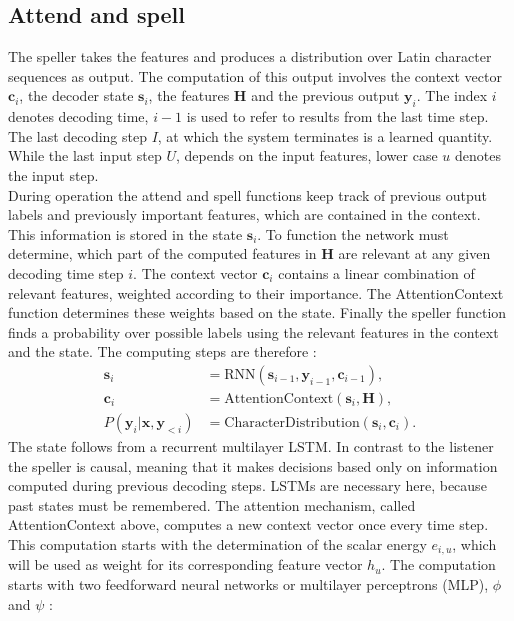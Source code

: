 \subsection{Attend and spell}
\label{subsec:AttendAndSpell}
The speller takes the features and produces a distribution over Latin character sequences as output. The computation of this output involves the context vector $\mathbf{c}_i$, the decoder state $\mathbf{s}_i$, the features $\mathbf{H}$ and the previous output $\mathbf{y}_i$. The index $i$ denotes decoding time, $i-1$ is used to refer to results from the last time step. The last decoding step $I$, at which the system terminates is a learned quantity. While the last input step $U$, depends on the input features, lower case $u$ denotes the input step.\\
During operation the attend and spell functions keep track of previous output labels and previously important features, which are contained in the context. This information is stored in the state $\mathbf{s}_i$. To function the network must determine, which part of the computed features in $\mathbf{H}$ are relevant at any given decoding time step $i$. The context vector $\mathbf{c}_i$ contains a linear combination of relevant features, weighted according to their importance. The AttentionContext function determines these weights based on the state. Finally the speller function finds a probability over possible labels using the relevant features in the context and the state. The computing steps are therefore \cite[page 4]{Chan2015}:
\begin{align}
 \mathbf{s}_i &= \text{RNN}(\mathbf{s}_{i-1}, \mathbf{y}_{i-1}, \mathbf{c}_{i-1}), \\
 \mathbf{c}_i &= \text{AttentionContext}(\mathbf{s}_i,\mathbf{H}), \\
  P(\mathbf{y}_i|\mathbf{x}, \mathbf{y}_{<i}) &= \text{CharacterDistribution}(\mathbf{s}_i,\textbf{c}_i).
\end{align}
The state follows from a recurrent multilayer LSTM. In contrast to the listener the speller is causal, meaning that it makes decisions based only on information computed during previous decoding steps. LSTMs are necessary here, because past states must be remembered. The attention mechanism, called AttentionContext above, computes a new context vector once every time step.
This computation starts with the determination of the scalar energy $e_{i,u}$, which will be used as weight for its corresponding feature vector  $h_u$. The computation starts with two feedforward neural networks or multilayer perceptrons (MLP), $\phi$ and $\psi$ \cite[page 5]{Chan2015}:
